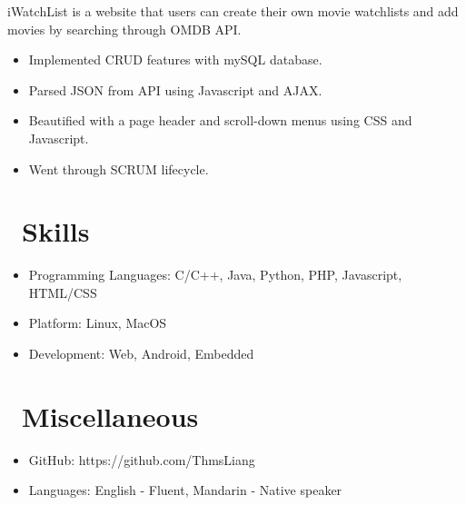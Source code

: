 \documentclass{resume}
\begin{document}
iWatchList is a website that users can create their own movie watchlists and add movies by searching through OMDB API.
\begin{itemize}
  \item Implemented CRUD features with mySQL database.
  \item Parsed JSON from API using Javascript and AJAX.
  \item Beautified with a page header and scroll-down menus using CSS and Javascript.
  \item Went through SCRUM lifecycle.
\end{itemize}



\section{\faCogs\ Skills}
\begin{itemize}[parsep=0.5ex]
  \item Programming Languages: C/C++, Java, Python, PHP, Javascript, HTML/CSS
  \item Platform: Linux, MacOS
  \item Development: Web, Android, Embedded
\end{itemize}

\section{\faInfo\ Miscellaneous}
\begin{itemize}[parsep=0.5ex]
  \item GitHub: https://github.com/ThmsLiang
  \item Languages: English - Fluent, Mandarin - Native speaker
\end{itemize}

%
%
\end{document}
